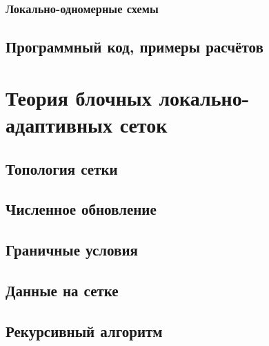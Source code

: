 \documentclass[a4paper, 14pt]{article}
\begin{document}
            \subsubsection{Локально-одномерные схемы}\label{sec:LOS}
            
        \subsection{Программный код, примеры расчётов}\label{sec:StaticCode}
        
    
    \section{Теория блочных локально-адаптивных сеток}\label{sec:LAG}
    
        
        \subsection{Топология сетки}
        

        \subsection{Численное обновление}
        

        \subsection{Граничные условия}
        

        \subsection{Данные на сетке}
        

        \subsection{Рекурсивный алгоритм}
        
\end{document}
